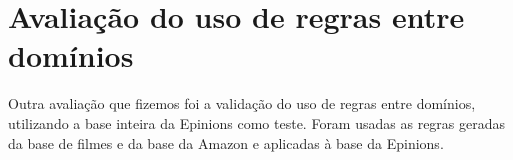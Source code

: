 \documentclass[template.tex]{subfiles}
\begin{document}
%
%

\section{Avaliação do uso de regras entre domínios}

Outra avaliação que fizemos foi a validação do uso de regras entre domínios, utilizando a base inteira da Epinions como teste. Foram usadas as regras geradas da base de filmes e da base da Amazon e aplicadas à base da Epinions.
\end{document}
